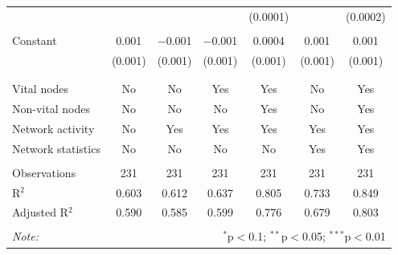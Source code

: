 \begin{table}[!htbp]
\begin{tabular}{@{\extracolsep{5pt}}lcccccc}
  &  &  &  & (0.0001) &  & (0.0002) \\ 
  & & & & & & \\ 
 Constant & 0.001 & $-$0.001 & $-$0.001 & 0.0004 & 0.001 & 0.001 \\ 
  & (0.001) & (0.001) & (0.001) & (0.001) & (0.001) & (0.001) \\ 
  & & & & & & \\ 
\hline \\[-1.8ex] 
Vital nodes & No & No & Yes & Yes & No & Yes \\ 
Non-vital nodes & No & No & No & Yes & No & Yes \\ 
Network activity & No & Yes & Yes & Yes & Yes & Yes \\ 
Network statistics & No & No & No & No & Yes & Yes \\ 
\hline &  &  &  &  &  &  \\ 
Observations & 231 & 231 & 231 & 231 & 231 & 231 \\ 
R$^{2}$ & 0.603 & 0.612 & 0.637 & 0.805 & 0.733 & 0.849 \\ 
Adjusted R$^{2}$ & 0.590 & 0.585 & 0.599 & 0.776 & 0.679 & 0.803 \\ 
\hline 
\hline \\[-1.8ex] 
\textit{Note:}  & \multicolumn{6}{r}{$^{*}$p$<$0.1; $^{**}$p$<$0.05; $^{***}$p$<$0.01} \\ 
\end{tabular} 
\end{table} 
